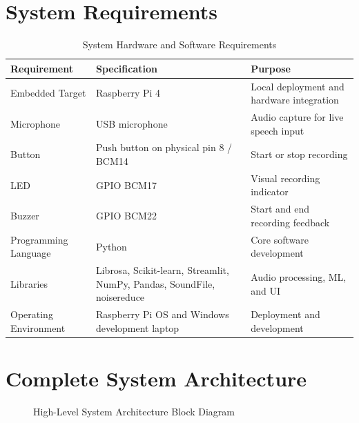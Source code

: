 \documentclass[12pt,a4paper]{report}
\begin{document}
\section{System Requirements}
\begin{table}[H]
\centering
\caption{System Hardware and Software Requirements}
\begin{tabular}{p{4cm}p{5cm}p{5cm}}
\toprule
\textbf{Requirement} & \textbf{Specification} & \textbf{Purpose}\\
\midrule
Embedded Target & Raspberry Pi 4 & Local deployment and hardware integration\\
Microphone & USB microphone & Audio capture for live speech input\\
Button & Push button on physical pin 8 / BCM14 & Start or stop recording\\
LED & GPIO BCM17 & Visual recording indicator\\
Buzzer & GPIO BCM22 & Start and end recording feedback\\
Programming Language & Python & Core software development\\
Libraries & Librosa, Scikit-learn, Streamlit, NumPy, Pandas, SoundFile, noisereduce & Audio processing, ML, and UI\\
Operating Environment & Raspberry Pi OS and Windows development laptop & Deployment and development\\
\bottomrule
\end{tabular}
\end{table}

\section{Complete System Architecture}
\begin{figure}[H]
\centering
{}
\caption{High-Level System Architecture Block Diagram}
\end{figure}
\end{document}
